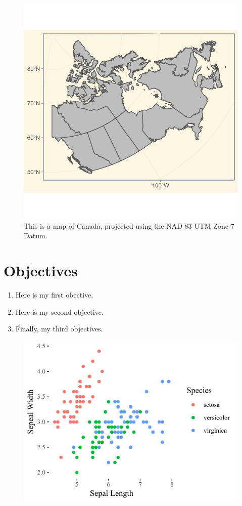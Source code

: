 \documentclass[article,30pt,extrafontsizes]{memoir}
\begin{document}
\begin{multicols*}{3}
{\begin{figure}
{\centering \includegraphics[width=0.8\linewidth]{skeleton_files/figure-latex/unnamed-chunk-2-1} 

}

\caption{This is a map of Canada, projected using the NAD 83 UTM Zone 7 Datum.}\label{fig:unnamed-chunk-2}
\end{figure}

\section{Objectives}\label{objectives}

\begin{enumerate}
\def\labelenumi{\arabic{enumi}.}
\tightlist
\item
  Here is my first obective.
\item
  Here is my second objective.
\item
  Finally, my third objectives.
\end{enumerate}

\begin{figure}

{\centering \includegraphics[width=0.6\linewidth]{skeleton_files/figure-latex/unnamed-chunk-3-1} 

}
\end{figure}}
\end{multicols*}
\end{document}
